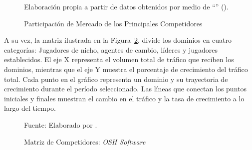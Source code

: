 \begin{figure}[htb]
    \centering
    \caption{Participación de Mercado de los Principales Competidores}
    \vspace{-0.2cm}
    \footnotesize{{Elaboración propia a partir de datos obtenidos por medio de ``\textit{}'' (\citeyear{SEMrushMarketExplorer}).}}
    \label{fig:visitas_por_dominio}
\end{figure}

A su vez, la matriz ilustrada en la Figura~\ref{fig:MatrizCompetidores}, divide los dominios en cuatro categorías: Jugadores de nicho, agentes de cambio, líderes y jugadores establecidos. El eje X representa el volumen total de tráfico que reciben los dominios, mientras que el eje Y muestra el porcentaje de crecimiento del tráfico total. Cada punto en el gráfico representa un dominio y su trayectoria de crecimiento durante el período seleccionado. Las líneas que conectan los puntos iniciales y finales muestran el cambio en el tráfico y la tasa de crecimiento a lo largo del tiempo.

\begin{figure}[htb]
    \centering
    \caption{Matriz de Competidores: \textit{OSH Software}}
    \vspace{-0.2cm}
	\footnotesize{Fuente: Elaborado por \cite{SEMrushMarketExplorer}.}
    \label{fig:MatrizCompetidores}
\end{figure}

